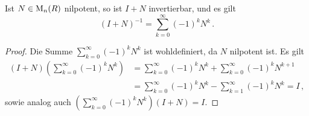 \begin{lemma}
  \label{lemma: inverse for unipotent}
  Ist $N \in \operatorname{M}_{n}(R)$ nilpotent, so ist $I + N$ invertierbar, und es gilt
  \[
      (I+N)^{-1}
    = \sum_{k=0}^\infty (-1)^k N^k\,.
  \]
\end{lemma}

\begin{proof}
  Die Summe $\sum_{k=0}^\infty (-1)^k N^k$ ist wohldefiniert, da $N$ nilpotent ist.
  Es gilt
  \begin{align*}
        (I+N)\left( \sum_{k=0}^\infty (-1)^k N^k \right)
    &=  \sum_{k=0}^\infty (-1)^k N^k + \sum_{k=0}^\infty (-1)^k N^{k+1}
    \\
    &=  \sum_{k=0}^\infty (-1)^k N^k - \sum_{k=1}^\infty (-1)^k N^k
     =  I\,,
  \end{align*}
  sowie analog auch $(\sum_{k=0}^\infty (-1)^k N^k) (I+N) = I$.
\end{proof}

